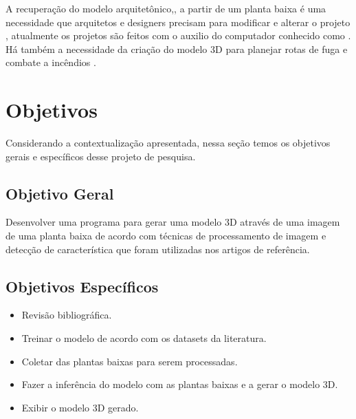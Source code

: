 
A recuperação do modelo arquitetônico,, a partir de um planta baixa é uma necessidade que arquitetos e designers precisam para modificar e alterar o projeto \cite{lv2021residential}, atualmente os projetos \iffalse achismo sem referencia \fi são feitos com o auxilio do computador conhecido como .
Há também a necessidade da criação do modelo 3D para planejar rotas de fuga e combate a incêndios \cite{kratochvila2024multi}.


\section{Objetivos}\label{cp:intro:obj}
Considerando a contextualização apresentada, nessa seção temos os objetivos gerais e específicos desse projeto de pesquisa.

\subsection{Objetivo Geral}\label{cp:intro:objgeral}
Desenvolver uma programa para gerar uma modelo 3D através de uma imagem de uma planta baixa de acordo com técnicas de processamento de imagem e detecção de característica que foram utilizadas nos artigos de referência. %

\subsection{Objetivos Específicos}\label{cp:intro:objespec}
\begin{itemize}
  \item Revisão bibliográfica.
  \item Treinar o modelo de acordo com os datasets da literatura. %
  \item Coletar das plantas baixas para serem processadas. %
  \item Fazer a inferência do modelo com as plantas baixas e a gerar o modelo 3D. %
  \item Exibir o modelo 3D gerado.%
\end{itemize}


